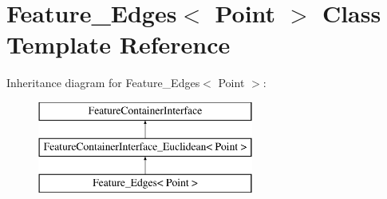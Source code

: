 \hypertarget{classFeature__Edges}{
\section{Feature\_\-Edges$<$ Point $>$ Class Template Reference}
\label{classFeature__Edges}
}
Inheritance diagram for Feature\_\-Edges$<$ Point $>$:\begin{figure}[H]
\begin{center}
\leavevmode
\includegraphics[height=3.000000cm]{classFeature__Edges}
\end{center}
\end{figure}
